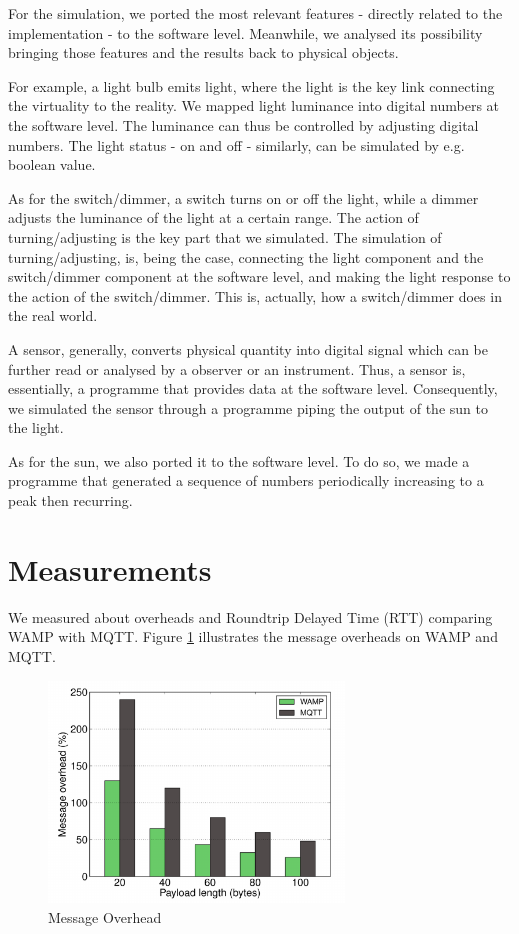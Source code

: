 For the simulation, we ported the most relevant features - directly related to the implementation - to the software level. Meanwhile, we analysed its possibility bringing those features and the results back to physical objects. 

For example, a light bulb emits light, where the light is the key link connecting the virtuality to the reality. We mapped light luminance into digital numbers at the software level. The luminance can thus be controlled by adjusting digital numbers. The light status - on and off - similarly, can be simulated by e.g. boolean value. 

As for the switch/dimmer, a switch turns on or off the light, while a dimmer adjusts the luminance of the light at a certain range. The action of turning/adjusting is the key part that we simulated. The simulation of turning/adjusting, is, being the case, connecting the light component and the switch/dimmer component at the software level, and making the light response to the action of the switch/dimmer. This is, actually, how a switch/dimmer does in the real world.

A sensor, generally, converts physical quantity into digital signal which can be further read or analysed by a observer or an instrument. Thus, a sensor is, essentially, a programme that provides data at the software level. Consequently, we simulated the sensor through a programme piping the output of the sun to the light.

As for the sun, we also ported it to the software level. To do so, we made a programme that generated a sequence of numbers periodically increasing to a peak then recurring.

\section{Measurements}
We measured about overheads and Roundtrip Delayed Time (RTT) comparing WAMP with MQTT. Figure \ref{fig:overhead} illustrates the message overheads on WAMP and MQTT.

\begin{figure}[t]
  \begin{center}
    \includegraphics[width=0.7\textwidth]{images/overhead.pdf}
    \caption{Message Overhead}
    \label{fig:overhead}
  \end{center}
\end{figure}

